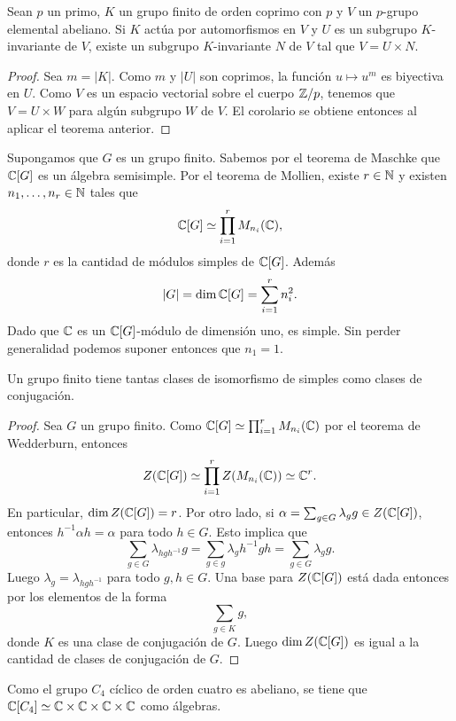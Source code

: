 \begin{corollary}
    Sean $p$ un primo, $K$ un grupo finito de orden coprimo con $p$ y $V$ un $p$-grupo elemental abeliano. 
    Si $K$ actúa por automorfismos en $V$ y $U$ es un subgrupo $K$-invariante de $V$, 
    existe un subgrupo $K$-invariante $N$ de $V$ tal que $V=U\times N$.
\end{corollary}

\begin{proof}
Sea $m=|K|$. Como $m$ y $|U|$ son coprimos, la función 
$u\mapsto u^m$ es biyectiva en $U$. Como $V$ es un espacio
vectorial sobre el cuerpo $\mathbb{Z}/p$, tenemos que
$V=U\times W$ para algún subgrupo $W$ de $V$. El corolario se obtiene
entonces al aplicar el teorema anterior.
\end{proof}

Supongamos que $G$ es un grupo finito. 
Sabemos por el teorema de Maschke que $\mathbb{C}[G]$ es un
álgebra semisimple. Por el teorema de Mollien, existe $r\in\mathbb{N}$ y
existen $n_1,\dots,n_r\in\mathbb{N}$ tales que 
\[
	\mathbb{C}[G]\simeq \prod_{i=1}^r M_{n_i}(\mathbb{C}),
\]
donde $r$ es la cantidad de módulos simples de $\mathbb{C}[G]$. 
Además 
\[
	|G|=\dim\mathbb{C}[G]=\sum_{i=1}^r n_i^2.
\]
Dado que $\mathbb{C}$ es un $\mathbb{C}[G]$-módulo de dimensión uno, es simple. 
Sin perder generalidad podemos suponer entonces
que $n_1=1$. 

\begin{theorem}
	Un grupo finito tiene tantas clases de isomorfismo de simples como clases
	de conjugación.
\end{theorem}

\begin{proof}
    Sea $G$ un grupo finito. Como $\mathbb{C}[G]\simeq\prod_{i=1}^rM_{n_i}(\mathbb{C})$ 
    por el teorema de Wedderburn,
	entonces
	\[
		Z(\mathbb{C}[G])\simeq\prod_{i=1}^rZ(M_{n_i}(\mathbb{C}))\simeq\mathbb{C}^r.
	\]
	En particular, $\dim Z(\mathbb{C}[G])=r$. Por otro lado, si $\alpha=\sum_{g\in
	G}\lambda_gg\in Z(\mathbb{C}[G])$, entonces $h^{-1}\alpha h=\alpha$ para todo $h\in
	G$. Esto implica que
	\[
		\sum_{g\in G}\lambda_{hgh^{-1}}g=
		\sum_{g\in g}\lambda_g h^{-1}gh=\sum_{g\in G}\lambda_gg.
	\]
	Luego $\lambda_{g}=\lambda_{hgh^{-1}}$ para todo $g,h\in G$. Una base para
	$Z(\mathbb{C}[G])$ está dada entonces por los elementos de la forma
	\[
		\sum_{g\in K}g,
	\]
	donde $K$ es una clase de conjugación de $G$. Luego $\dim Z(\mathbb{C}[G])$ es
	igual a la cantidad de clases de conjugación de $G$.
\end{proof}

\begin{example}
    Como el grupo $C_4$ cíclico de orden cuatro es abeliano, 
    se tiene que $\mathbb{C}[C_4]\simeq\mathbb{C}\times\mathbb{C}\times\mathbb{C}\times\mathbb{C}$ como álgebras. 
\end{example}

